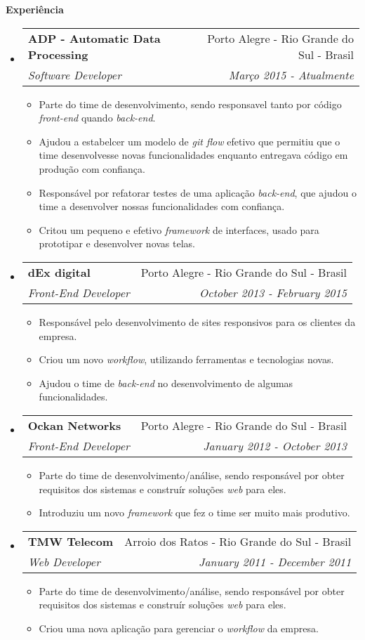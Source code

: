 \documentclass[letterpaper,11pt]{article}
\makeatletter
\newcommand{\resitem}[1]{\item #1 \vspace{-2pt}}
\newcommand{\resheading}[1]{{\large \colorbox{mygrey}{\begin{minipage}{\textwidth}{\textbf{#1 \vphantom{p\^{E}}}}\end{minipage}}}}
\newcommand{\ressubheading}[4]{
\begin{tabular*}{7.0in}{l@{\extracolsep{\fill}}r}
    \textbf{#1} & #2 \\
    \textit{#3} & \textit{#4} \\
\end{tabular*}\vspace{-6pt}}
\makeatother
\begin{document}
    \resheading{Experiência}
    \begin{itemize}
        \item
            \ressubheading
                {ADP - Automatic Data Processing}
                {Porto Alegre - Rio Grande do Sul - Brasil}
                {Software Developer}
                {Março 2015 - Atualmente}
            \begin{itemize}
                \resitem{Parte do time de desenvolvimento, sendo responsavel tanto por código \textit{front-end} quando \textit{back-end}.}
                \resitem{Ajudou a estabelcer um modelo de \textit{git flow} efetivo que permitiu que o time desenvolvesse novas funcionalidades enquanto entregava código em produção com confiança.}
                \resitem{Responsável por refatorar testes de uma aplicação \textit{back-end}, que ajudou o time a desenvolver nossas funcionalidades com confiança.}
                \resitem{Critou um pequeno e efetivo \textit{framework} de interfaces, usado para prototipar e desenvolver novas telas.}
            \end{itemize}

        \item
            \ressubheading
                {dEx digital}
                {Porto Alegre - Rio Grande do Sul - Brasil}
                {Front-End Developer}
                {October 2013 - February 2015}
            \begin{itemize}
                \resitem{Responsável pelo desenvolvimento de sites responsivos para os clientes da empresa.}
                \resitem{Criou um novo \textit{workflow}, utilizando ferramentas e tecnologias novas.}
                \resitem{Ajudou o time de \textit{back-end} no desenvolvimento de algumas funcionalidades.}
            \end{itemize}

        \item
            \ressubheading
                {Ockan Networks}
                {Porto Alegre - Rio Grande do Sul - Brasil}
                {Front-End Developer}
                {January 2012 - October 2013}
            \begin{itemize}
                \resitem{Parte do time de desenvolvimento/análise, sendo responsável por obter requisitos dos sistemas e construír soluções \textit{web} para eles.}
                \resitem{Introduziu um novo \textit{framework} que fez o time ser muito mais produtivo.}
            \end{itemize}

        \item
            \ressubheading
                {TMW Telecom}
                {Arroio dos Ratos - Rio Grande do Sul - Brasil}
                {Web Developer}
                {January 2011 - December 2011}
            \begin{itemize}
                \resitem{Parte do time de desenvolvimento/análise, sendo responsável por obter requisitos dos sistemas e construír soluções \textit{web} para eles.}
                \resitem{Criou uma nova aplicação para gerenciar o \textit{workflow} da empresa.}
            \end{itemize}
    \end{itemize}
\end{document}
